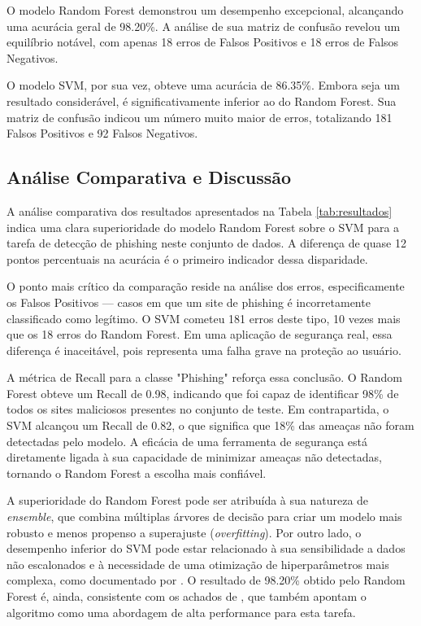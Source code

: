 \documentclass[12pt]{article}
\begin{document}
O modelo Random Forest demonstrou um desempenho excepcional, alcançando uma acurácia geral de 98.20\%. A análise de sua matriz de confusão revelou um equilíbrio notável, com apenas 18 erros de Falsos Positivos e 18 erros de Falsos Negativos.

O modelo SVM, por sua vez, obteve uma acurácia de 86.35\%. Embora seja um resultado considerável, é significativamente inferior ao do Random Forest. Sua matriz de confusão indicou um número muito maior de erros, totalizando 181 Falsos Positivos e 92 Falsos Negativos.

\subsection{Análise Comparativa e Discussão}
A análise comparativa dos resultados apresentados na Tabela \ref{tab:resultados} indica uma clara superioridade do modelo Random Forest sobre o SVM para a tarefa de detecção de phishing neste conjunto de dados. A diferença de quase 12 pontos percentuais na acurácia é o primeiro indicador dessa disparidade.

O ponto mais crítico da comparação reside na análise dos erros, especificamente os Falsos Positivos — casos em que um site de phishing é incorretamente classificado como legítimo. O SVM cometeu 181 erros deste tipo, 10 vezes mais que os 18 erros do Random Forest. Em uma aplicação de segurança real, essa diferença é inaceitável, pois representa uma falha grave na proteção ao usuário.

A métrica de Recall para a classe "Phishing" reforça essa conclusão. O Random Forest obteve um Recall de 0.98, indicando que foi capaz de identificar 98\% de todos os sites maliciosos presentes no conjunto de teste. Em contrapartida, o SVM alcançou um Recall de 0.82, o que significa que 18\% das ameaças não foram detectadas pelo modelo. A eficácia de uma ferramenta de segurança está diretamente ligada à sua capacidade de minimizar ameaças não detectadas, tornando o Random Forest a escolha mais confiável.

A superioridade do Random Forest pode ser atribuída à sua natureza de \textit{ensemble}, que combina múltiplas árvores de decisão para criar um modelo mais robusto e menos propenso a superajuste (\textit{overfitting}). Por outro lado, o desempenho inferior do SVM pode estar relacionado à sua sensibilidade a dados não escalonados e à necessidade de uma otimização de hiperparâmetros mais complexa, como documentado por \textcite{hastie2009elements}. O resultado de 98.20\% obtido pelo Random Forest é, ainda, consistente com os achados de \textcite{mandadi2022}, que também apontam o algoritmo como uma abordagem de alta performance para esta tarefa.
\end{document}
